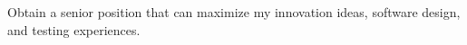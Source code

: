 Obtain a senior position
that can maximize my innovation ideas,
     software design,
     and testing experiences.
